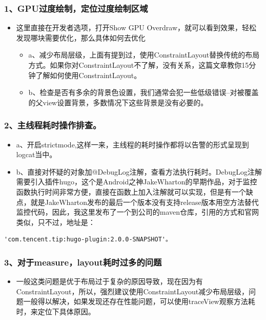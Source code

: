 \documentclass[9pt, b5paper]{article}
\begin{document}
\subsubsection{1、GPU过度绘制，定位过度绘制区域}
\label{sec-1-8-1}
\begin{itemize}
\item 这里直接在开发者选项，打开Show GPU Overdraw，就可以看到效果，轻松发现哪块需要优化，那么具体如何去优化
\begin{itemize}
\item a、减少布局层级，上面有提到过，使用ConstraintLayout替换传统的布局方式。如果你对ConstraintLayout不了解，没有关系，这篇文章教你15分钟了解如何使用ConstraintLayout。
\item b、检查是否有多余的背景色设置，我们通常会犯一些低级错误--对被覆盖的父view设置背景，多数情况下这些背景是没有必要的。
\end{itemize}
\end{itemize}
\subsubsection{2、主线程耗时操作排查。}
\label{sec-1-8-2}
\begin{itemize}
\item a、开启strictmode,这样一来，主线程的耗时操作都将以告警的形式呈现到logcat当中。
\item b、直接对怀疑的对象加@DebugLog注解，查看方法执行耗时。DebugLog注解需要引入插件hugo，这个是Android之神JakeWharton的早期作品，对于监控函数执行时间非常方便，直接在函数上加入注解就可以实现，但是有一个缺点，就是JakeWharton发布的最后一个版本没有支持release版本用空方法替代监控代码，因此，我这里发布了一个到公司的maven仓库，引用的方式和官网类似，只不过，地址是：
\end{itemize}
\begin{verbatim}
'com.tencent.tip:hugo-plugin:2.0.0-SNAPSHOT'。
\end{verbatim}
\subsubsection{3、对于measure，layout耗时过多的问题}
\label{sec-1-8-3}
\begin{itemize}
\item 一般这类问题是优于布局过于复杂的原因导致，现在因为有ConstraintLayout，所以，强烈建议使用ConstraintLayout减少布局层级，问题一般得以解决，如果发现还存在性能问题，可以使用traceView观察方法耗时，来定位下具体原因。
\end{itemize}
\end{document}
